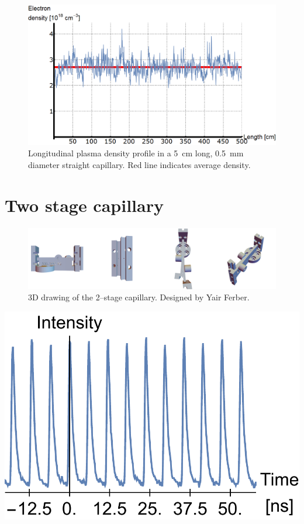 \documentclass[../main.tex]{subfiles}
\begin{document}
\begin{figure}[b]
    \centering
    \includegraphics[width=\textwidth]{figures/spectro/longitudinal_profile.png}
    \caption{Longitudinal plasma density profile in a \SI{5}{\cm} long, \SI{0.5}{\mm} diameter straight capillary. Red line indicates average density.}
    \label{fig:longi_profile}
\end{figure}

\section{Two stage capillary}

\begin{figure}
    \centering
    \includegraphics[width=\textwidth]{figures/doublecapillary_cad.png}
    \caption{3D drawing of the 2--stage capillary. Designed by Yair Ferber.}
    \label{fig:doublecapillaryCAD}
\end{figure}

\begin{marginfigure}
\includegraphics[width=\marginparwidth]{figures/oscillator/double.pdf}
\label{fig:oscillator_double}
\caption{Two \SI{84}{\MHz} temporal beam profiles of the oscillator laser, one delayed with respect to the other.}
\end{marginfigure}
\end{document}
